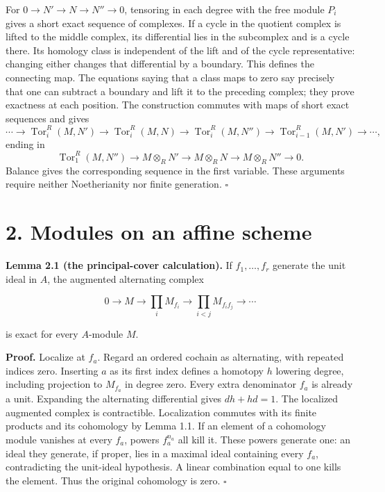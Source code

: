 \documentclass[11pt,a4paper,openany]{report}
\begin{document}
For \(0\to N'\to N\to N''\to0\), tensoring in each degree with the free module \(P_i\) gives a short exact sequence of complexes. If a cycle in the quotient complex is lifted to the middle complex, its differential lies in the subcomplex and is a cycle there. Its homology class is independent of the lift and of the cycle representative: changing either changes that differential by a boundary. This defines the connecting map. The equations saying that a class maps to zero say precisely that one can subtract a boundary and lift it to the preceding complex; they prove exactness at each position. The construction commutes with maps of short exact sequences and gives \[
\cdots\longrightarrow\operatorname{Tor}_i^R(M,N')
\longrightarrow\operatorname{Tor}_i^R(M,N)
\longrightarrow\operatorname{Tor}_i^R(M,N'')
\longrightarrow\operatorname{Tor}_{i-1}^R(M,N')\longrightarrow\cdots,
\] ending in \[
\operatorname{Tor}_1^R(M,N'')\longrightarrow M\otimes_RN'
\longrightarrow M\otimes_RN\longrightarrow M\otimes_RN''\longrightarrow0.
\] Balance gives the corresponding sequence in the first variable. These arguments require neither Noetherianity nor finite generation. \(\square\)

\section{2. Modules on an affine scheme}\label{AG-RG-S01-modules-on-an-affine-scheme}

\textbf{Lemma 2.1 (the principal-cover calculation).} If \(f_1,\ldots,f_r\) generate the unit ideal in \(A\), the augmented alternating complex

\[
0\longrightarrow M\longrightarrow\prod_i M_{f_i}
\longrightarrow\prod_{i<j}M_{f_if_j}\longrightarrow\cdots
\]

is exact for every \(A\)-module \(M\).

\textbf{Proof.} Localize at \(f_a\). Regard an ordered cochain as alternating, with repeated indices zero. Inserting \(a\) as its first index defines a homotopy \(h\) lowering degree, including projection to \(M_{f_a}\) in degree zero. Every extra denominator \(f_a\) is already a unit. Expanding the alternating differential gives \(dh+hd=1\). The localized augmented complex is contractible. Localization commutes with its finite products and its cohomology by Lemma 1.1. If an element of a cohomology module vanishes at every \(f_a\), powers \(f_a^{n_a}\) all kill it. These powers generate one: an ideal they generate, if proper, lies in a maximal ideal containing every \(f_a\), contradicting the unit-ideal hypothesis. A linear combination equal to one kills the element. Thus the original cohomology is zero. \(\square\)
\end{document}
